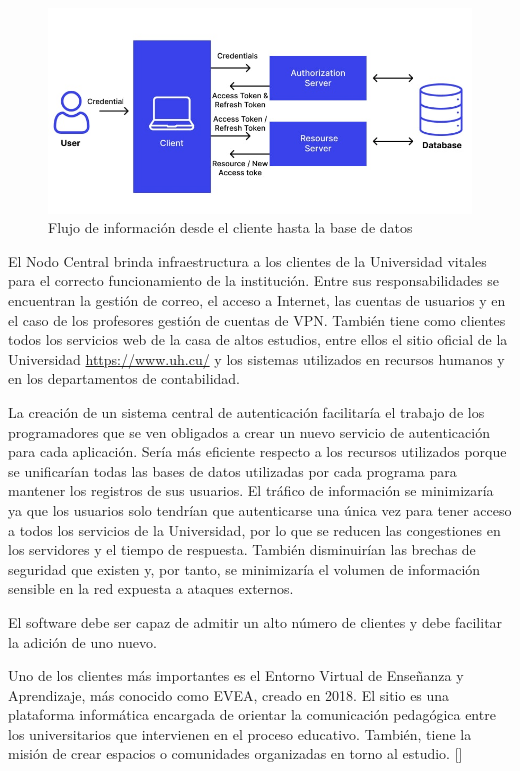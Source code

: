 \begin{figure}[H]
	\centering
	\includegraphics[width=0.9\linewidth]{Graphics/token-based-auth}
	\caption{Flujo de información desde el cliente hasta la base de datos}
	\label{fig:token-based-auth}
\end{figure}

El Nodo Central brinda infraestructura a los clientes de la Universidad vitales para el correcto funcionamiento de la institución. Entre sus responsabilidades se encuentran la gestión de correo, el acceso a Internet, las cuentas de usuarios y en el caso de los profesores gestión de cuentas de VPN. También tiene como clientes todos los servicios web de la casa de altos estudios, entre ellos el sitio oficial de la Universidad \url{https://www.uh.cu/} y los sistemas utilizados en recursos humanos y en los departamentos de contabilidad.

La creación de un sistema central de autenticación facilitaría el trabajo de los programadores que se ven obligados a crear un nuevo servicio de autenticación para cada aplicación. Sería más eficiente respecto a los recursos utilizados porque se unificarían todas las bases de datos utilizadas por cada programa para mantener los registros de sus usuarios. El tráfico de información se minimizaría ya que los usuarios solo tendrían que autenticarse una única vez para tener acceso a todos los servicios de la Universidad, por lo que se reducen las congestiones en los servidores y el tiempo de respuesta. También disminuirían las brechas de seguridad que existen y, por tanto, se minimizaría el volumen de información sensible en la red expuesta a ataques externos.

El software debe ser capaz de admitir un alto número de clientes y debe facilitar la adición de uno nuevo.

Uno de los clientes más importantes es el Entorno Virtual de Enseñanza y Aprendizaje, más conocido como EVEA, creado en 2018. El sitio es una plataforma informática encargada de orientar la comunicación pedagógica entre los universitarios que intervienen en el proceso educativo. También, tiene la misión de crear espacios o comunidades organizadas en torno al estudio. [\cite{evea-cd}] 

